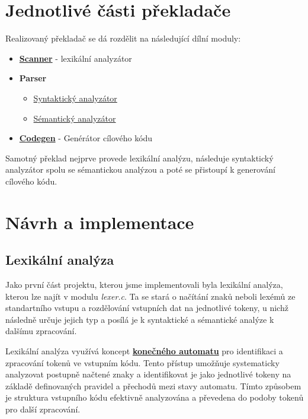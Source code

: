 \documentclass[a4paper, 12pt]{article} %
\begin{document}
    \section{Jednotlivé části překladače}
    Realizovaný překladač se dá rozdělit na následující dílní moduly:
    \begin{itemize}[noitemsep]
        \item \hyperref[lexer]{\textbf{Scanner}} - lexikální analyzátor
        \item \textbf{Parser}
            \begin{itemize}
                \item \hyperref[syntactics]{Syntaktický analyzátor}
                \item \hyperref[semantics]{Sémantický analyzátor}
            \end{itemize}
        \item \hyperref[codegen]{\textbf{Codegen}} - Genérátor cílového kódu
    \end{itemize}
    Samotný překlad nejprve provede lexikální analýzu, následuje syntaktický 
    analyzátor spolu se sémantickou analýzou a poté se přistoupí k generování 
    cílového kódu. 

    \section{Návrh a implementace} \label{lexer}
        \subsection{Lexikální analýza}
            Jako první část projektu, kterou jsme implementovali byla lexikální analýza, kterou
            lze najít v modulu \textit{lexer.c}. Ta se
            stará o načítání znaků neboli lexémů ze standartního vstupu a rozdělování vstupních dat na 
            jednotlivé tokeny, u nichž následně určuje jejich typ a posílá 
            je k syntaktické a sémantické analýze k 
            dalšímu zpracování. 

            Lexikální analýza využívá koncept \hyperref[kodiagram]{\textbf{konečného automatu}} pro 
            identifikaci a zpracování tokenů ve vstupním kódu. Tento přístup umožňuje systematicky 
            analyzovat postupně načtené znaky a identifikovat je jako jednotlivé tokeny na základě 
            definovaných pravidel a přechodů mezi stavy automatu. Tímto způsobem je struktura 
            vstupního kódu efektivně analyzována a převedena do podoby tokenů pro další zpracování. 
\end{document}
